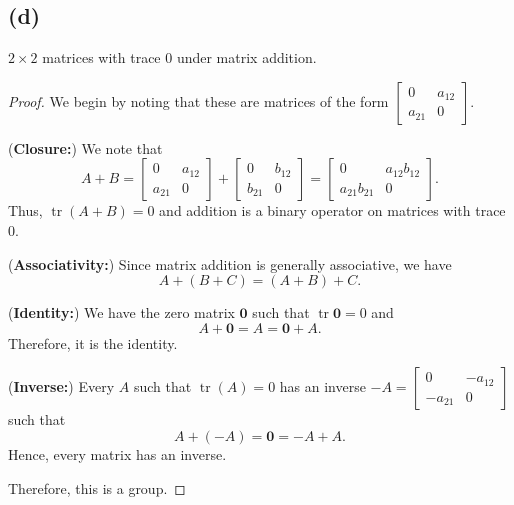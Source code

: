 \documentclass{article}
\DeclareMathOperator*{\tr}{tr}
\begin{document}
\subsection*{(d)}
$2\times 2$ matrices with trace 0 under matrix addition.

\begin{proof}
    We begin by noting that these are matrices of the form $\begin{bmatrix}
            0      & a_{12} \\
            a_{21} & 0
        \end{bmatrix}$.

    (\textbf{Closure:})
    We note that
    \begin{equation*}
        A + B = \begin{bmatrix}
            0      & a_{12} \\
            a_{21} & 0
        \end{bmatrix} + \begin{bmatrix}
            0      & b_{12} \\
            b_{21} & 0
        \end{bmatrix} =
        \begin{bmatrix}
            0              & a_{12} b_{12} \\
            a_{21}  b_{21} & 0
        \end{bmatrix}.
    \end{equation*}
    Thus, $\tr(A + B) = 0$ and addition is a binary operator on matrices
    with trace 0.

    (\textbf{Associativity:})
    Since matrix addition is generally associative, we have
    \begin{equation*}
        A + (B + C) = (A + B) + C.
    \end{equation*}

    (\textbf{Identity:})
    We have the zero matrix $\bm{0}$ such that $\tr{\bm{0}} = 0$ and
    \begin{equation*}
        A + \bm{0} = A = \bm{0} + A.
    \end{equation*}
    Therefore, it is the identity.

    (\textbf{Inverse:})
    Every $A$ such that $\tr(A) = 0$ has an inverse
    $-A = \begin{bmatrix}
            0       & -a_{12} \\
            -a_{21} & 0
        \end{bmatrix}$
    such that
    \begin{equation*}
        A + (-A) = \bm{0} = -A + A.
    \end{equation*}
    Hence, every matrix has an inverse.

    Therefore, this is a group.

\end{proof}
\end{document}
